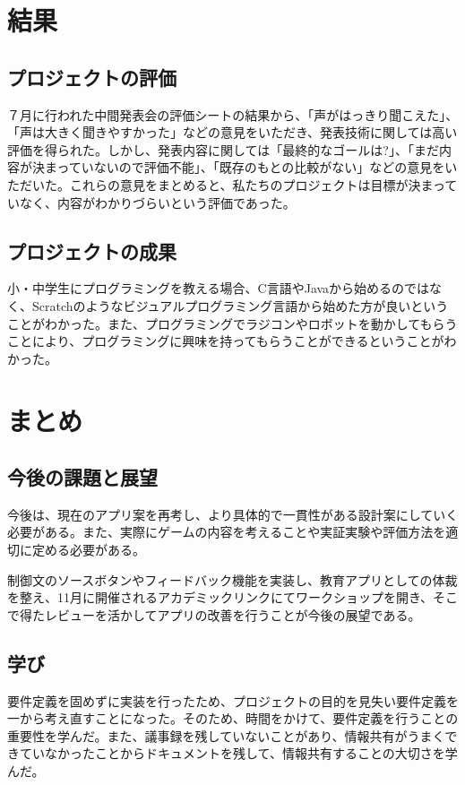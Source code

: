 \documentclass[openany,11pt,papersize]{jsbook}
\begin{document}

\chapter{結果}
\section{プロジェクトの評価}
７月に行われた中間発表会の評価シートの結果から、「声がはっきり聞こえた」、「声は大きく聞きやすかった」などの意見をいただき、発表技術に関しては高い評価を得られた。しかし、発表内容に関しては「最終的なゴールは?」、「まだ内容が決まっていないので評価不能」、「既存のもとの比較がない」などの意見をいただいた。これらの意見をまとめると、私たちのプロジェクトは目標が決まっていなく、内容がわかりづらいという評価であった。

\section{プロジェクトの成果}
小・中学生にプログラミングを教える場合、C言語やJavaから始めるのではなく、Scratchのようなビジュアルプログラミング言語から始めた方が良いということがわかった。また、プログラミングでラジコンやロボットを動かしてもらうことにより、プログラミングに興味を持ってもらうことができるということがわかった。


\chapter{まとめ}
\section{今後の課題と展望}
今後は、現在のアプリ案を再考し、より具体的で一貫性がある設計案にしていく必要がある。また、実際にゲームの内容を考えることや実証実験や評価方法を適切に定める必要がある。
\par
制御文のソースボタンやフィードバック機能を実装し、教育アプリとしての体裁を整え、11月に開催されるアカデミックリンクにてワークショップを開き、そこで得たレビューを活かしてアプリの改善を行うことが今後の展望である。

\section{学び}
要件定義を固めずに実装を行ったため、プロジェクトの目的を見失い要件定義を一から考え直すことになった。そのため、時間をかけて、要件定義を行うことの重要性を学んだ。また、議事録を残していないことがあり、情報共有がうまくできていなかったことからドキュメントを残して、情報共有することの大切さを学んだ。
\end{document}

